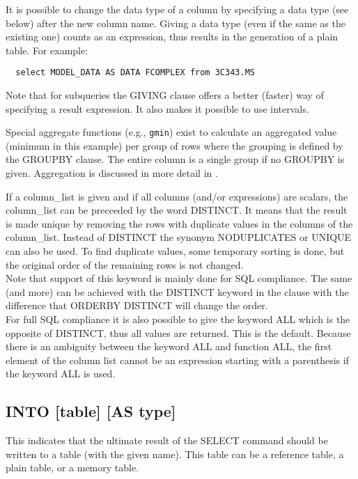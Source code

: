It is possible to change the data type of a column by specifying a
data type (see below) after the new column name. Giving a data type
(even if the same as the existing one) counts as an expression,
thus results in the generation of a plain table.
For example:
\begin{verbatim}
  select MODEL_DATA AS DATA FCOMPLEX from 3C343.MS
\end{verbatim}

Note that for subqueries the GIVING clause offers a
better (faster) way of specifying a result expression. It also makes it
possible to use intervals.

Special aggregate functions (e.g., \texttt{gmin}) exist to calculate
an aggregated value (minimum in this example) per group of rows where
the grouping is defined by the GROUPBY clause. The entire column is a
single group if no GROUPBY is given. Aggregation is discussed in more
detail in .

If a column\_list is given and if all columns (and/or expressions) are
scalars, the column\_list can be preceeded by the word DISTINCT.
It means that the result is made unique by removing the rows
with duplicate values in the columns of the column\_list.
Instead of DISTINCT the synonym NODUPLICATES or UNIQUE can also
be used.
To find duplicate values, some temporary sorting is done,
but the original order of the remaining rows is not changed.
\\Note that support of this keyword is mainly done for SQL
compliance. The same (and more) can be achieved with the
DISTINCT keyword in the  clause
with the difference that ORDERBY DISTINCT will change the order.
\\For full SQL compliance it is also possible to give the keyword
ALL which is the opposite of DISTINCT, thus all values are
returned. This is the default. Because there is an ambiguity between
the keyword ALL and function ALL, the first element of the column
list cannot be an expression starting with a parenthesis if the
keyword ALL is used.

\subsection{\label{TAQL:INTO}INTO [table] [AS type]}
This indicates that the ultimate result of the SELECT command should be
written to a table (with the given name). This table can be a
reference table, a plain table, or a memory table.

